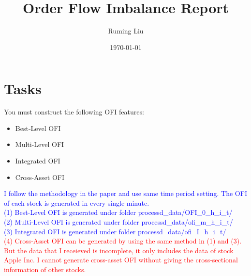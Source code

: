 \documentclass[12pt, a4paper]{article}
\title{Order Flow Imbalance Report}
\author{Ruming Liu}
\date{\today}
\begin{document}
\maketitle


\section{Tasks}

You must construct the following OFI features: 

\begin{itemize}
    \item Best-Level OFI 
    \item Multi-Level OFI
    \item Integrated OFI
    \item Cross-Asset OFI
\end{itemize}

\textcolor{blue}{I follow the methodology in the paper and use same time period setting. The OFI of each stock is generated in every single minute.}\\

\textcolor{blue}{(1) Best-Level OFI is generated under folder processd\_data/OFI\_0\_h\_i\_t/}\\

\textcolor{blue}{(2) Multi-Level OFI is generated under folder processd\_data/ofi\_m\_h\_i\_t/}\\

\textcolor{blue}{(3) Integrated OFI is generated under folder processd\_data/ofi\_I\_h\_i\_t/}\\

\textcolor{red}{(4) Cross-Asset OFI can be generated by using the same method in (1) and (3). But the data that I receieved is incomplete, it only includes the data of stock Apple Inc. I cannot generate cross-asset OFI without giving the cross-sectional information of other stocks.}
\end{document}
